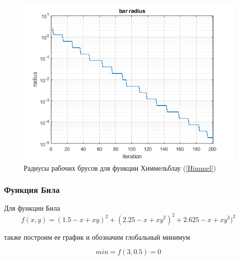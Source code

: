 \documentclass[12pt,a4paper]{article}
\begin{document}
                
                \begin{figure}[H]
                    \centering
                    \includegraphics[width=13cm]{Himmel_radius.png}
                    \caption{Радиусы рабочих брусов для функции Химмельблау (\ref{Himmel})} \label{fig:Himmel_radius}
                \end{figure}
            
            \newpage
            
            \subsubsection{Функция Била}
                Для функции Била
                \begin{equation}\label{Booth}
                    f(x, y) = (1.5 - x + xy)^2 + (2.25 - x + xy^2)^2 + 2.625 - x + xy^3)^2
                \end{equation}
                
                также построим ее график и обозначим глобальный минимум
                
                \begin{equation}
                    min = f(3, 0.5) = 0
                \end{equation}
                
\end{document}
